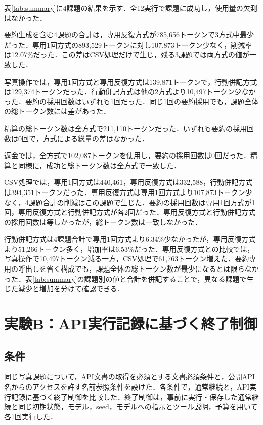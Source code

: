 \documentclass[letter]{ieicej}
\begin{document}
表\ref{tab:summary}に4課題の結果を示す．全12実行で課題に成功し，使用量の欠測はなかった．

\SummaryResultsTable

要約生成を含む4課題の合計は，専用反復方式が785,656トークンで3方式中最少だった．専用1回方式の893,529トークンに対し107,873トークン少なく，削減率は12.07\%だった．この差はCSV処理だけで生じ，残る3課題では両方式の値が一致した．

写真操作では，専用1回方式と専用反復方式は139,871トークンで，行動併記方式は129,374トークンだった．行動併記方式は他の2方式より10,497トークン少なかった．要約の採用回数はいずれも1回だった．同じ1回の要約採用でも，課題全体の総トークン数には差があった．

精算の総トークン数は全方式で211,110トークンだった．いずれも要約の採用回数は0回で，方式による総量の差はなかった．

返金では，全方式で102,087トークンを使用し，要約の採用回数は0回だった．精算と同様に，成功と総トークン数は全方式で一致した．

CSV処理では，専用1回方式は440,461，専用反復方式は332,588，行動併記方式は394,351トークンだった．専用反復方式は専用1回方式より107,873トークン少なく，4課題合計の削減はこの課題で生じた．要約の採用回数は専用1回方式が1回，専用反復方式と行動併記方式が各2回だった．専用反復方式と行動併記方式の採用回数は等しかったが，総トークン数は一致しなかった．

行動併記方式は4課題合計で専用1回方式より6.34\%少なかったが，専用反復方式より51,266トークン多く，増加率は6.53\%だった．専用反復方式との比較では，写真操作で10,497トークン減る一方，CSV処理で61,763トークン増えた．要約専用の呼出しを省く構成でも，課題全体の総トークン数が最少になるとは限らなかった．表\ref{tab:summary}の課題別の値と合計を併記することで，異なる課題で生じた減少と増加を分けて確認できる．

\section{実験B：API実行記録に基づく終了制御}

\subsection{条件}

同じ写真課題について，API文書の取得を必須とする文書必須条件と，公開API名からのアクセスを許す名前参照条件を設けた．各条件で，通常継続と，API実行記録に基づく終了制御を比較した．終了制御は，事前に実行・保存した通常継続と同じ初期状態，モデル，seed，モデルへの指示とツール説明，予算を用いて各1回実行した．
\end{document}
